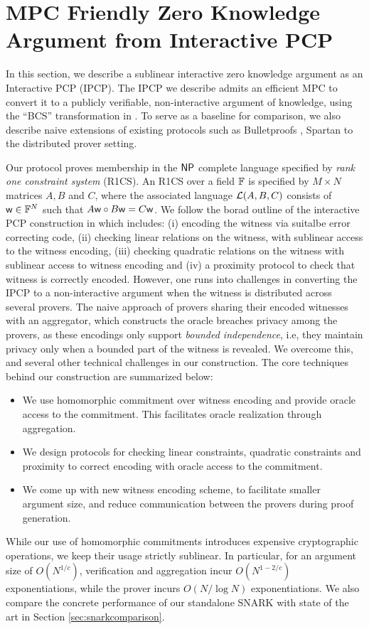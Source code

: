 \section{MPC Friendly Zero Knowledge Argument from Interactive PCP}
In this section, we describe a sublinear interactive zero knowledge argument as
an Interactive PCP (IPCP). The IPCP we describe admits an efficient MPC to
convert it to a publicly verifiable, non-interactive argument of knowledge,
using the ``BCS'' transformation in \cite{IOP2016}. To serve as a
baseline for comparison, we also describe naive extensions of existing protocols
such as Bulletproofs \cite{bulletproofs}, Spartan \cite{spartan} to the
distributed prover setting. 

Our protocol proves membership in the $\mathsf{NP}$ complete
language specified by {\em rank one constraint system} (R1CS). An R1CS over a
field $\mathbb{F}$ is specified by $M\times N$ matrices $A,B$ and $C$, where the
associated language $\mathcal{L}(A,B,C)$ consists of $\mathsf{w}\in \mathbb{F}^N$ such that
$A\mathsf{w}\circ B\mathsf{w}=C\mathsf{w}$. We follow the borad outline of the interactive PCP
construction in \cite{ligero} which includes: (i) encoding the witness via suitalbe
error correcting code, (ii) checking linear relations on the witness, with
sublinear access to the witness encoding, (iii) checking quadratic relations on
the witness with sublinear access to witness encoding and (iv) a proximity
protocol to check that witness is correctly encoded. However, one runs into 
challenges in converting the IPCP to a non-interactive
argument when the witness is distributed across several provers. The naive
approach of provers sharing their encoded witnesses with an aggregator, which
constructs the oracle breaches privacy among the provers, as these encodings
only support {\em bounded independence}, i.e, they maintain privacy only when a
bounded part of the witness is revealed. We overcome this, and several other
technical challenges in our construction. The core techniques behind our
construction are summarized below:
\begin{itemize}
\item We use homomorphic commitment over witness encoding and provide oracle
access to the commitment. This facilitates oracle realization through
aggregation.
\item We design protocols for checking linear constraints, quadratic constraints
and proximity to correct encoding with oracle access to the commitment.
\item We come up with new witness encoding scheme, to facilitate smaller
argument size, and reduce communication between the provers during proof
generation.
\end{itemize}
While our use of homomorphic commitments introduces expensive cryptographic
operations, we keep their usage strictly sublinear. In particular, for an
argument size of $O(N^{1/c})$, verification and aggregation incur $O(N^{1-2/c})$
exponentiations, while the prover incurs $O(N/\log N)$ exponentiations. We also
compare the concrete performance of our standalone SNARK with state of the art in Section
\ref{sec:snarkcomparison}.
